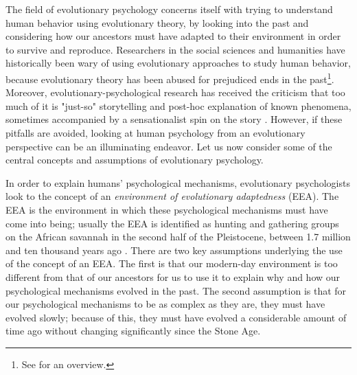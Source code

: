 The field of evolutionary psychology concerns itself with trying to understand human behavior using evolutionary theory, by looking into the past and considering how our ancestors must have adapted to their environment in order to survive and reproduce.
Researchers in the social sciences and humanities have historically been wary of using evolutionary approaches to study human behavior, because evolutionary theory has been abused for prejudiced ends in the past\footnote{See \citet[pp.~19--20]{LB02} for an overview.}. Moreover, evolutionary-psychological research has received the criticism that too much of it is "just-so" storytelling and post-hoc explanation of known phenomena, sometimes accompanied by a sensationalist spin on the story \citep{LB02}.
However, if these pitfalls are avoided, looking at human psychology from an evolutionary perspective can be an illuminating endeavor.
Let us now consider some of the central concepts and assumptions of evolutionary psychology.

In order to explain humans' psychological mechanisms, evolutionary psychologists look to the concept of an \emph{environment of evolutionary adaptedness} (EEA). The EEA is the environment in which these psychological mechanisms must have come into being; usually the EEA is identified as hunting and gathering groups on the African savannah in the second half of the Pleistocene, between 1.7 million and ten thousand years ago \citep{LB02}.
There are two key assumptions underlying the use of the concept of an EEA.
The first is that our modern-day environment is too different from that of our ancestors for us to use it to explain why and how our psychological mechanisms evolved in the past.
The second assumption is that for our psychological mechanisms to be as complex as they are, they must have evolved slowly; because of this, they must have evolved a considerable amount of time ago without changing significantly since the Stone Age.

